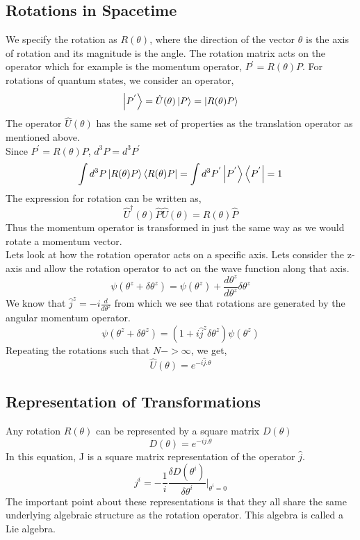 \subsection{Rotations in Spacetime}
We specify the rotation as $R(\theta)$, where the direction of the vector $\theta$ is the axis of rotation and its magnitude is the angle. The rotation matrix acts on the operator which for example is the momentum operator, $P^{'}= R(\theta) P$. For rotations of quantum states, we consider an operator, 
\begin{equation}
    \ket{P^{'}} = \hat{U}(\theta) \ket{P} = \ket{R(\theta)P}
\end{equation}
The operator $\hat{U}(\theta)$ has the same set of properties as the translation operator as mentioned above. \\
Since $P^{'} = R(\theta)P$, $d^{3}P= d^{3}P^{'}$
\begin{equation}
   \int d^{3}P \ket{R(\theta)P} \bra{R(\theta)P} = \int d^{3}P^{'}\ket{P^{'}}\bra{P^{'}} = 1
\end{equation}
The expression for rotation can be written as, 
\begin{equation}
    \hat{U}^{\dagger}(\theta) \hat{P} \hat{U}(\theta) = R(\theta) \hat{P}
\end{equation}
Thus the momentum operator is transformed in just the same way as we would rotate a momentum vector. \\
Lets look at how the rotation operator acts on a specific axis. Lets consider the z-axis and allow the rotation operator to act on the wave function along that axis. 
\begin{equation}
\psi(\theta^{z} + \delta \theta^{z}) = \psi(\theta^{z}) + \frac{d \theta^{z}}{d \theta^{z}}\delta \theta^{z}
\end{equation}
We know that $\hat{j}^{z}= - i \frac{d}{d \theta^{z}}$ from which we see that rotations are generated by the angular momentum operator. 
\begin{equation}
    \psi(\theta^{z} + \delta \theta^{z}) = (1+i \hat{j}^{z} \delta \theta^{z}) \psi(\theta^{z})
\end{equation}
Repeating the rotations such that $N-> \infty$, we get, 
\begin{equation}
    \hat{U}(\theta)= e^{-i \hat{j}.\theta}
\end{equation}
\subsection{Representation of Transformations}
Any rotation $R(\theta)$ can be represented by a square matrix $D(\theta)$
\begin{equation}
    D(\theta) =  e^{-i j.\theta}
\end{equation}  
In this equation, J is a square matrix representation of the operator $\hat{j}$. \begin{equation}
    j^{i} = -\frac{1}{i} \frac{\delta D(\theta^{i})}{\delta \theta^{i}}|_{\theta^{i} = 0}
\end{equation}
The important point about these representations is that they all share the same underlying algebraic structure as the rotation operator. This algebra is called a Lie algebra.
